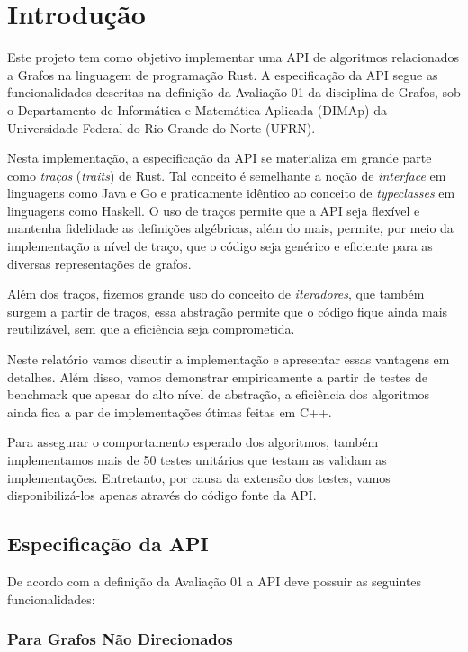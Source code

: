 \chapter{Introdução}
\label{ch:intro}

Este projeto tem como objetivo implementar uma API de
algoritmos relacionados a Grafos na linguagem de programação Rust. A
especificação da API segue as funcionalidades descritas na
definição da Avaliação 01 da disciplina de Grafos, sob o Departamento
de Informática e Matemática Aplicada (DIMAp) da Universidade Federal
do Rio Grande do Norte (UFRN).

Nesta implementação, a especificação da API se materializa em grande
parte como \emph{traços} (\textit{traits}) de Rust. Tal conceito é
semelhante a noção de \textit{interface} em linguagens como Java
e Go e praticamente idêntico ao conceito de \textit{typeclasses} em
linguagens como Haskell. O uso de traços permite que a API seja
flexível e mantenha fidelidade as definições algébricas, além do
mais, permite, por meio da implementação a nível de traço, que o código
seja genérico e eficiente para as diversas representações de grafos.

Além dos traços, fizemos grande uso do conceito de \textit{iteradores}, que
também surgem a partir de traços, essa abstração permite que o código
fique ainda mais reutilizável, sem que a eficiência seja comprometida.

Neste relatório vamos discutir a implementação e apresentar essas
vantagens em detalhes. Além disso, vamos demonstrar empiricamente a
partir de testes de benchmark que apesar do alto nível de abstração,
a eficiência dos algoritmos ainda fica a par de implementações ótimas
feitas em C++.

Para assegurar o comportamento esperado dos algoritmos, também
implementamos mais de 50 testes unitários que testam as
validam as implementações. Entretanto, por causa da extensão dos testes, vamos
disponibilizá-los apenas através do código fonte da API.

\section{Especificação da API}
\label{sec:api_spec}

De acordo com a definição da Avaliação 01 a API deve possuir as
seguintes funcionalidades:

\subsection{Para Grafos Não Direcionados}


